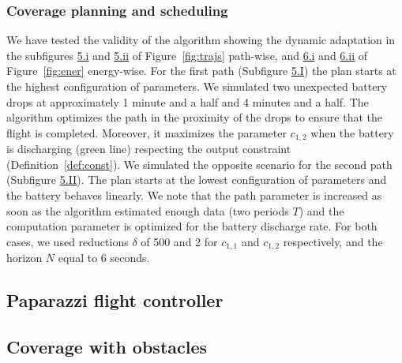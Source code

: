 \subsubsection*{Coverage planning and scheduling}

We have tested the validity of the algorithm showing the dynamic adaptation in the subfigures \hyperref[fig:trajs-dyn-i]{5.i} and \hyperref[fig:trajs-dyn-ii]{5.ii} of Figure~\ref{fig:trajs} path-wise, and \hyperref[fig:ener-dyn-i]{6.i} and \hyperref[fig:ener-dyn-ii]{6.ii} of Figure~\ref{fig:ener} energy-wise. For the first path (Subfigure \hyperref[fig:trajs-I-static]{5.I}) the plan starts at the highest configuration of parameters. We simulated two unexpected battery drops at approximately 1 minute and a half and 4 minutes and a half. The algorithm optimizes the path in the proximity of the drops to ensure that the flight is completed. Moreover, it maximizes the parameter $c_{1,2}$ when the battery is discharging (green line) respecting the output constraint (Definition~\ref{def:const}). We simulated the opposite scenario for the second path (Subfigure \hyperref[fig:trajs-II-static]{5.II}). The plan starts at the lowest configuration of parameters and the battery behaves linearly. We note that the path parameter is increased as soon as the algorithm estimated enough data (two periods $T$) and the computation parameter is optimized for the battery discharge rate. For both cases, we used reductions $\delta$ of 500 and 2 for $c_{1,1}$ and $c_{1,2}$ respectively, and the horizon $N$ equal to 6 seconds.



\subsection{Paparazzi flight controller}
\label{sec:res-papa}

\subsection{Coverage with obstacles}
\label{sec:res-obsta}
